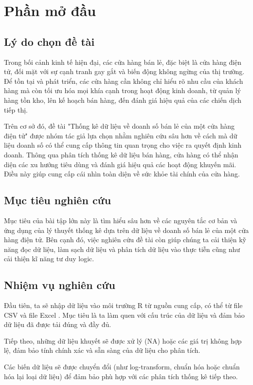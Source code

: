 \section{Phần mở đầu}
\fontsize{12pt}{0pt}
\selectfont
\subsection{Lý do chọn đề tài}
Trong bối cảnh kinh tế hiện đại, các cửa hàng bán lẻ, đặc biệt là cửa hàng điện tử, đối mặt với sự cạnh tranh gay gắt và biến động không ngừng của thị trường. Để tồn tại và phát triển, các cửa hàng cần không chỉ hiểu rõ nhu cầu của khách hàng mà còn tối ưu hóa mọi khía cạnh trong hoạt động kinh doanh, từ quản lý hàng tồn kho, lên kế hoạch bán hàng, đến đánh giá hiệu quả của các chiến dịch tiếp thị.

Trên cơ sở đó, đề tài "Thống kê dữ liệu về doanh số bán lẻ của một cửa hàng điện tử" được nhóm tác giả lựa chọn nhằm nghiên cứu sâu hơn về cách mà dữ liệu doanh số có thể cung cấp thông tin quan trọng cho việc ra quyết định kinh doanh. Thông qua phân tích thống kê dữ liệu bán hàng, cửa hàng có thể nhận diện các xu hướng tiêu dùng và đánh giá hiệu quả các hoạt động khuyến mãi. Điều này giúp cung cấp cái nhìn toàn diện về sức khỏe tài chính của cửa hàng.
\subsection{Mục tiêu nghiên cứu}
Mục tiêu của bài tập lớn này là tìm hiểu sâu hơn về các nguyên tắc cơ bản và ứng dụng của lý thuyết thống kê dựa trên dữ liệu về doanh số bán lẻ của một cửa hàng điện tử. Bên cạnh đó, việc nghiên cứu đề tài còn giúp chúng ta cải thiện kỹ năng đọc dữ liệu, làm sạch dữ liệu và phân tích dữ liệu vào thực tiễn cũng như cải thiện kĩ năng tư duy logic.
\subsection{Nhiệm vụ nghiên cứu}
Đầu tiên, ta sẽ nhập dữ liệu vào môi trường R từ nguồn cung cấp, có thể từ file CSV và file Excel . Mục tiêu là ta làm quen với cấu trúc của dữ liệu và đảm bảo dữ liệu đã được tải đúng và đầy đủ.

Tiếp theo, những dữ liệu khuyết sẽ được xử lý (NA) hoặc các giá trị không hợp lệ, đảm bảo tính chính xác và sẵn sàng của dữ liệu cho phân tích.

Các biến dữ liệu sẽ được chuyển đổi (như log-transform, chuẩn hóa hoặc chuẩn hóa lại loại dữ liệu) để đảm bảo phù hợp với các phân tích thống kê tiếp theo.

